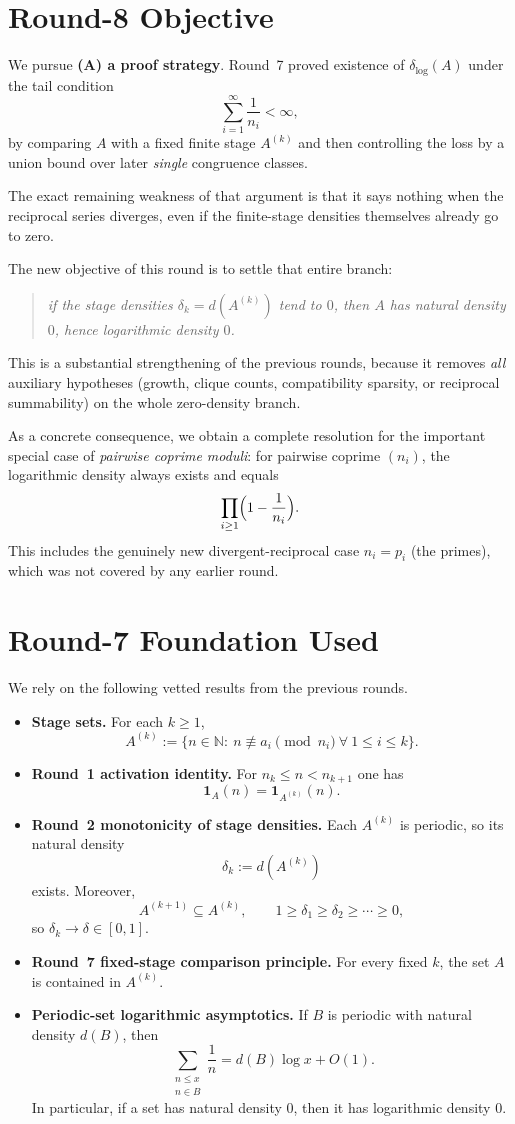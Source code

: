 \section{Round-8 Objective}
We pursue \textbf{(A) a proof strategy}.  Round~7 proved existence of $\delta_{\log}(A)$ under the tail condition
\[
\sum_{i=1}^{\infty}\frac1{n_i}<\infty,
\]
by comparing $A$ with a fixed finite stage $A^{(k)}$ and then controlling the loss by a union bound over later \emph{single} congruence classes.

The exact remaining weakness of that argument is that it says nothing when the reciprocal series diverges, even if the finite-stage densities themselves already go to zero.

The new objective of this round is to settle that entire branch:
\begin{quote}
\emph{if the stage densities $\delta_k=d(A^{(k)})$ tend to $0$, then $A$ has natural density $0$, hence logarithmic density $0$.}
\end{quote}
This is a substantial strengthening of the previous rounds, because it removes \emph{all} auxiliary hypotheses (growth, clique counts, compatibility sparsity, or reciprocal summability) on the whole zero-density branch.

As a concrete consequence, we obtain a complete resolution for the important special case of \emph{pairwise coprime moduli}: for pairwise coprime $(n_i)$, the logarithmic density always exists and equals
\[
\prod_{i\ge 1}\Bigl(1-\frac1{n_i}\Bigr).
\]
This includes the genuinely new divergent-reciprocal case $n_i=p_i$ (the primes), which was not covered by any earlier round.

\section{Round-7 Foundation Used}
We rely on the following vetted results from the previous rounds.
\begin{itemize}
\item \textbf{Stage sets.}
For each $k\ge 1$,
\[
A^{(k)}:=\{n\in\mathbb N:\ n\not\equiv a_i \pmod{n_i}\ \forall\ 1\le i\le k\}.
\]
\item \textbf{Round~1 activation identity.}
For $n_k\le n<n_{k+1}$ one has
\[
\mathbf 1_A(n)=\mathbf 1_{A^{(k)}}(n).
\]
\item \textbf{Round~2 monotonicity of stage densities.}
Each $A^{(k)}$ is periodic, so its natural density
\[
\delta_k:=d(A^{(k)})
\]
exists.  Moreover,
\[
A^{(k+1)}\subseteq A^{(k)},
\qquad
1\ge \delta_1\ge \delta_2\ge \cdots \ge 0,
\]
so $\delta_k\to \delta\in[0,1]$.
\item \textbf{Round~7 fixed-stage comparison principle.}
For every fixed $k$, the set $A$ is contained in $A^{(k)}$.
\item \textbf{Periodic-set logarithmic asymptotics.}
If $B$ is periodic with natural density $d(B)$, then
\[
\sum_{\substack{n\le x\\ n\in B}}\frac1n
=
d(B)\log x+O(1).
\]
In particular, if a set has natural density $0$, then it has logarithmic density $0$.
\end{itemize}

